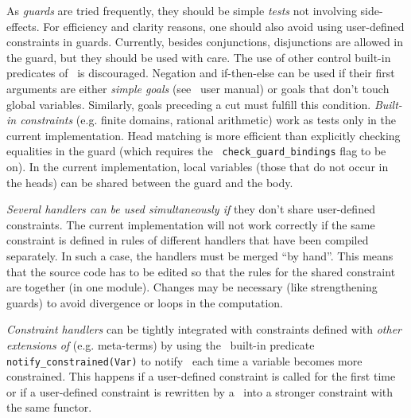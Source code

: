 
As {\em guards} are tried frequently, they should be
simple {\em tests} not involving side-effects. For efficiency and
clarity reasons, one should also avoid using user-defined constraints
in guards.  Currently, besides conjunctions, disjunctions are allowed
in the guard, but they should be used with care.  The use of other
control built-in predicates of \eclipse\ is discouraged.  Negation and
if-then-else can be used if their first arguments are either {\em
simple goals} (see \eclipse\ user manual) or goals that don't touch
global variables. Similarly, goals preceding a cut must fulfill this
condition.
%
{\em Built-in constraints} (e.g. finite domains, rational arithmetic)
work as tests only in the current implementation.  
%
Head matching is more efficient than
explicitly checking equalities in the guard (which requires the {\tt
check\_guard\_bindings} flag to be on).  
%
In the current
implementation, local variables (those
that do not occur in the heads) can be shared between the guard and
the body. 

{\em Several handlers can be used simultaneously if} they don't share
user-defined constraints. The current implementation will not work
correctly if the same constraint is defined in rules of different
handlers that have been compiled separately. In such a case, the
handlers must be merged ``by hand''. This means that the source code
has to be edited so that the rules for the shared constraint are
together (in one module). Changes may be necessary (like
strengthening guards) to avoid divergence or loops in the computation.

{\em Constraint handlers} can be tightly integrated with constraints
defined with {\em other extensions of \eclipse} (e.g. meta-terms) by using
the \eclipse\ built-in predicate {\tt notify\_constrained(Var)} to notify
\eclipse\ each time a variable becomes more constrained.
This happens if a user-defined constraint is called for the first time
or if a user-defined constraint is rewritten by a \chr\ into a stronger
constraint with the same functor.

